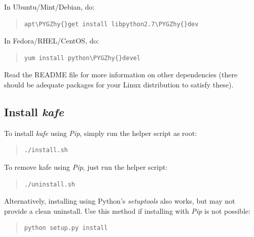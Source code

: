\documentclass[a4paper,10pt,english]{sphinxmanual}
\def\PYGZhy{\char`\-}
\begin{document}
In Ubuntu/Mint/Debian, do:
\begin{quote}

\begin{Verbatim}[commandchars=\\\{\}]
apt\PYGZhy{}get install libpython2.7\PYGZhy{}dev
\end{Verbatim}
\end{quote}

In Fedora/RHEL/CentOS, do:
\begin{quote}

\begin{Verbatim}[commandchars=\\\{\}]
yum install python\PYGZhy{}devel
\end{Verbatim}
\end{quote}

Read the README file for more information on other dependencies
(there should be adequate packages for your Linux distribution
to satisfy these).


\subsection{Install \emph{kafe}}
\label{installation:install-kafe}
To install \emph{kafe} using \emph{Pip}, simply run the helper script as root:
\begin{quote}

\begin{Verbatim}[commandchars=\\\{\}]
./install.sh
\end{Verbatim}
\end{quote}

To remove kafe using \emph{Pip}, just run the helper script:
\begin{quote}

\begin{Verbatim}[commandchars=\\\{\}]
./uninstall.sh
\end{Verbatim}
\end{quote}

Alternatively, installing using Python's \emph{setuptools} also works, but may not
provide a clean uninstall. Use this method if installing with \emph{Pip} is not possible:
\begin{quote}

\begin{Verbatim}[commandchars=\\\{\}]
python setup.py install
\end{Verbatim}
\end{quote}
\end{document}

